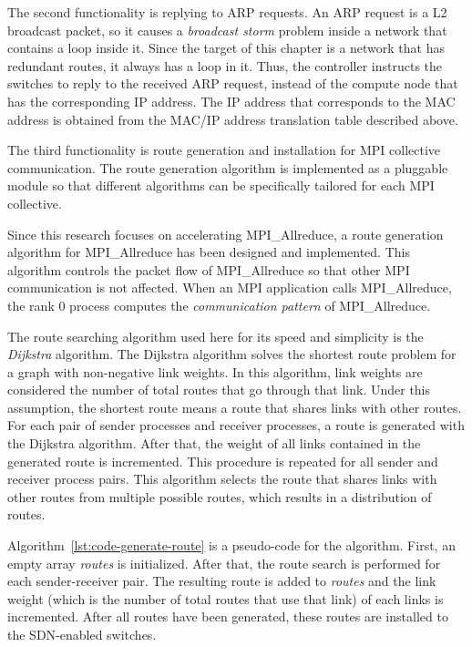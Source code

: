 The second functionality is replying to ARP requests. An ARP request is
a L2 broadcast packet, so it causes a \emph{broadcast storm} problem
inside a network that contains a loop inside it. Since the target of
this chapter is a network that has redundant routes, it always has a loop
in it. Thus, the controller instructs the switches to reply to the
received ARP request, instead of the compute node that has the
corresponding IP address. The IP address that corresponds to the MAC
address is obtained from the MAC/IP address translation table described above.

The third functionality is route generation and installation for MPI
collective communication. The route generation algorithm is implemented as a
pluggable module so that different algorithms can be specifically tailored for
each MPI collective.

Since this research focuses on accelerating MPI\_Allreduce, a route generation
algorithm for MPI\_Allreduce has been designed and implemented. This algorithm
controls the packet flow of MPI\_Allreduce so that other MPI communication is
not affected. When an MPI application calls MPI\_Allreduce, the rank 0 process
computes the \emph{communication pattern} of MPI\_Allreduce.

The route searching algorithm used here for its speed and simplicity is the
\emph{Dijkstra} algorithm. The Dijkstra algorithm solves the shortest route
problem for a graph with non-negative link weights. In this algorithm, link
weights are considered the number of total routes that go through that link.
Under this assumption, the shortest route means a route that shares links with
other routes. For each pair of sender processes and receiver processes, a
route is generated with the Dijkstra algorithm. After that, the weight of all
links contained in the generated route is incremented. This procedure is
repeated for all sender and receiver process pairs. This algorithm selects the
route that shares links with other routes from multiple possible routes, which
results in a distribution of routes.

Algorithm~\ref{lst:code-generate-route} is a pseudo-code for the algorithm.
First, an empty array \emph{routes} is initialized. After that, the
route search is performed for each sender-receiver pair. The resulting
route is added to \emph{routes} and the link weight (which is the number
of total routes that use that link) of each links is incremented. After
all routes have been generated, these routes are installed to the
SDN-enabled switches.

